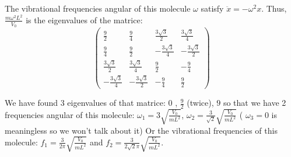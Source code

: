 \documentclass[12pt]{article}
\begin{document}
\noindent The vibrational frequencies angular of this molecule $\omega$ satisfy $\ddot{x} = - \omega^2 x$. Thus, $\frac{m \omega^2 L^2}{V_0}$ is the eigenvalues of the matrice:
$$\begin{pmatrix}
	\frac{9}{2} & \frac{9}{4} & \frac{3\sqrt{3}}{2} & \frac{3\sqrt{3}}{4} \\
	\frac{9}{4} & \frac{9}{2} & -\frac{3\sqrt{3}}{4} & -\frac{3\sqrt{3}}{2} \\
	\frac{3\sqrt{3}}{2} & \frac{3\sqrt{3}}{4} & \frac{9}{2} & -\frac{9}{4} \\
	-\frac{3\sqrt{3}}{4} & - \frac{3\sqrt{3}}{2} & -\frac{9}{4} & \frac{9}{2}
\end{pmatrix}$$

\noindent We have found 3 eigenvalues of that matrice: $0$ , $\frac{9}{2}$ (twice), $9$ so that we have 2 frequencies angular of this molecule: $\omega_1 = 3 \sqrt{ \frac{V_0}{m L^2} }$, $\omega_2 = \frac{3}{\sqrt{2}} \sqrt{ \frac{V_0}{m L^2}}$ ( $\omega_3 = 0$ is meaningless so we won't talk about it) Or the vibrational frequencies of this molecule: $f_1 = \frac{3}{2\pi} \sqrt{ \frac{V_0}{m L^2}}$ and $f_2 = \frac{3}{2 \sqrt{2} \pi} \sqrt{ \frac{V_0}{m L^2}}$. \\
\end{document}
